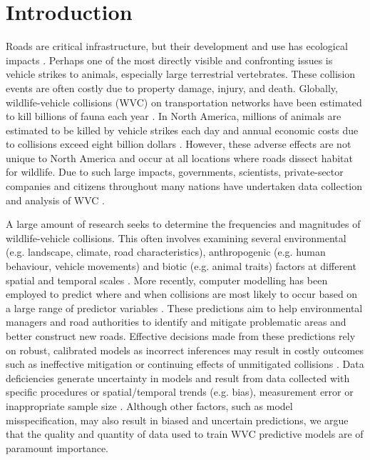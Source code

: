 \newpage
\section{Introduction}

Roads are critical infrastructure, but their development and use has ecological impacts \citep{form03}. Perhaps one of the most directly visible and confronting issues is vehicle strikes to animals, especially large terrestrial vertebrates. These collision events are often costly due to property damage, injury, and death. Globally, wildlife-vehicle collisions (WVC) on transportation networks have been estimated to kill billions of fauna each year \citep{seil06}. In North America, millions of animals are estimated to be killed by vehicle strikes each day \citep{form98} and annual economic costs due to collisions exceed eight billion dollars \citep{huij07b}. However, these adverse effects are not unique to North America and occur at all locations where roads dissect habitat for wildlife. Due to such large impacts, governments, scientists, private-sector companies and citizens throughout many nations have undertaken data collection and analysis of WVC \citep[see][]{rvdr15}.

A large amount of research seeks to determine the frequencies and magnitudes of wildlife-vehicle collisions. This often involves examining several environmental (e.g. landscape, climate, road characteristics), anthropogenic (e.g. human behaviour, vehicle movements) and biotic (e.g. animal traits) factors at different spatial and temporal scales \citep{litv08}. More recently, computer modelling has been employed to predict where and when collisions are most likely to occur based on a large range of predictor variables \citep{guns11}. These predictions aim to help environmental managers and road authorities to identify and mitigate problematic areas and better construct new roads. Effective decisions made from these predictions rely on robust, calibrated models as incorrect inferences may result in costly outcomes such as ineffective mitigation \citep[see][]{huij09} or continuing effects of unmitigated collisions \citep[see][]{biss08b}. Data deficiencies generate uncertainty in models and result from data collected with specific procedures or spatial/temporal trends (e.g. bias), measurement error or inappropriate sample size \citep{bean12}. Although other factors, such as model misspecification, may also result in biased and uncertain predictions, we argue that the quality and quantity of data used to train WVC predictive models are of paramount importance.

